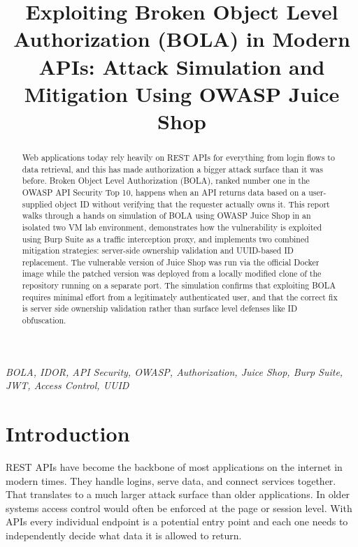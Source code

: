 \documentclass[12pt]{IEEEtran}
\begin{document}
\title{Exploiting Broken Object Level Authorization
(BOLA) in Modern APIs: Attack Simulation and
Mitigation Using OWASP Juice Shop}

\author{
}

\maketitle

\begin{abstract}
Web applications today rely heavily on REST APIs for everything from login flows to data retrieval, and this has made authorization a bigger attack surface than it was before. Broken Object Level Authorization (BOLA), ranked number one in the OWASP API Security Top 10, happens when an API returns data based on a user-supplied object ID without verifying that the requester actually owns it. This report walks through a hands on simulation of BOLA using OWASP Juice Shop in an isolated two VM lab environment, demonstrates how the vulnerability is exploited using Burp Suite as a traffic interception proxy, and implements two combined mitigation strategies: server-side ownership validation and UUID-based ID replacement. The vulnerable version of Juice Shop was run via the official Docker image while the patched version was deployed from a locally modified clone of the repository running on a separate port. The simulation confirms that exploiting BOLA requires minimal effort from a legitimately authenticated user, and that the correct fix is server side ownership validation rather than surface level defenses like ID obfuscation.
\end{abstract}

\begin{IEEEkeywords}
\textit{BOLA, IDOR, API Security, OWASP, Authorization, Juice Shop, Burp Suite, JWT, Access Control, UUID}
\end{IEEEkeywords}

\section{Introduction}

REST APIs have become the backbone of most applications on the internet in modern times. They handle logins, serve data, and connect services together. That translates to a much larger attack surface than older applications. In older systems access control would often be enforced at the page or session level. With APIs every individual endpoint is a potential entry point and each one needs to independently decide what data it is allowed to return.
\end{document}
